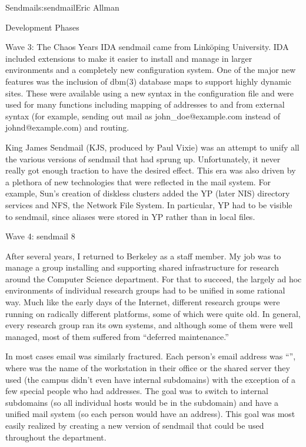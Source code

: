 \begin{aosachapter}{Sendmail}{s:sendmail}{Eric Allman}
\begin{aosasect1}{Development Phases}
\begin{aosasect2}{Wave 3: The Chaos Years}
IDA sendmail came from Link\"{o}ping University.  IDA included extensions
to make it easier to install and manage in larger environments and a
completely new configuration system. One of the major new features was
the inclusion of dbm(3) database maps to support highly dynamic
sites. These were available using a new syntax in the configuration
file and were used for many functions including mapping of addresses
to and from external syntax (for example, sending out mail as
john\_doe@example.com instead of johnd@example.com) and routing.

King James Sendmail (KJS, produced by Paul Vixie) was an attempt to
unify all the various versions of sendmail that had sprung
up. Unfortunately, it never really got enough traction to have the
desired effect.  This era was also driven by a plethora of new
technologies that were reflected in the mail system. For example,
Sun's creation of diskless clusters added the YP (later NIS) directory
services and NFS, the Network File System.  In particular, YP had to be
visible to sendmail,
since aliases were stored in YP rather than in local files.

\end{aosasect2}

\begin{aosasect2}{Wave 4: sendmail 8}

After several years, I returned to Berkeley as a staff member. My job
was to manage a group installing and supporting shared infrastructure
for research around the Computer Science department. For that to
succeed, the largely ad hoc environments of individual research groups
had to be unified in some rational way. Much like the early days of
the Internet, different research groups were running on radically
different platforms, some of which were quite old. In general, every
research group ran its own systems, and although some of them were
well managed, most of them suffered from ``deferred maintenance.''

In most cases email was similarly fractured. Each person's email
address was ``'', where  was
the name of the workstation in their office or the shared server they
used (the campus didn't even have internal subdomains) with the
exception of a few special people who had  addresses. The
goal was to switch to internal subdomains (so all individual hosts
would be in the  subdomain) and have a unified
mail system (so each person would have an 
address). This goal was most easily realized by creating a new version
of sendmail that could be used throughout the department.


\end{aosasect2}
\end{aosasect1}
\end{aosachapter}
